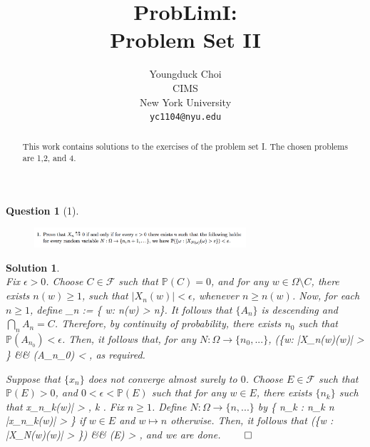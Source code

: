 \documentclass{article} %
\title{ProbLimI: \\
Problem Set II}
\author{
Youngduck Choi \\
CIMS \\
New York University\\
\texttt{yc1104@nyu.edu} \\
}
\def\eQb#1\eQe{\begin{eqnarray*}#1\end{eqnarray*}}
\theoremstyle{quest}
\newtheorem*{question}{Question}
\newtheorem*{solution}{Solution}
\begin{document}
\maketitle

\begin{abstract}
This work contains solutions to the exercises of the problem set I. The
chosen problems are 1,2, and 4.
\end{abstract}

\bigskip

\begin{question}[1]
\hfill
\begin{figure}[h!]
  \centering
    \includegraphics[width=0.7\textwidth]{prob-e3-p1.png}
\end{figure}
\end{question}
\begin{solution} \hfill \\
Fix $\epsilon > 0$.  
Choose $C \in \mathscr{F}$ such that $\mathbb{P}(C) = 0$,
and for any $w \in \Omega \setminus C$, 
there exists $n(w) \geq 1$, such that $|X_n(w)| < \epsilon$, whenever $n \geq n(w)$.
Now, for each $n \geq 1$, define
\eQb
A_n := \{ w: n(w) > n\}. 
\eQe 
It follows that $\{ A_n \}$ is descending and $\bigcap_n A_n = C$. Therefore, by
continuity of probability, there exists $n_0$ such that $\mathbb{P}(A_{n_0}) < 
\epsilon$. Then, it follows that, for any $N:\Omega \to \{ n_0,...\}$, 
\eQb
\mathbb{P}(\{w: |X_{n(w)}(w)| > \epsilon\} &\leq& (A_{n_0}) < \epsilon, 
\eQe  
as required.

\bigskip

Suppose that $\{x_n\}$ does not converge almost surely to $0$. Choose
$E \in \mathscr{F}$ such that $\mathbb{P}(E) > 0$, and $0 < \epsilon < \mathbb{P}(E)$
such that for any $w \in E$, there exists $\{n_k\}$ such that
\eQb
|x_{n_k}(w)| > \epsilon , \>\>  \>\> k .
\eQe  
Fix $n \geq 1$. Define $N: \Omega \to \{n,...\}$ by 
\eQb
w \mapsto \inf\{ n_k \>: \> 
n_k \geq n \>\>  \>\> |x_{n_k}(w)| > \epsilon \} 
\eQe
if $w \in E$ and $w \mapsto n$ otherwise.
Then, it follows that
\eQb
\mathbb{P}(\{w : |X_{N(w)}(w)| > \epsilon\}) &\geq& (E) > \epsilon, 
\eQe
and we are done. \hfill $\qed$


\end{solution}

\newpage
\end{document}
